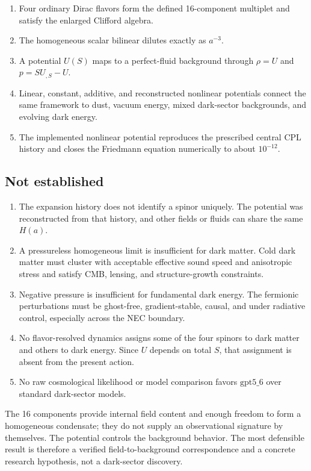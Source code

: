 \documentclass[11pt]{article}
\newcommand{\gptfield}{\ensuremath{\mathrm{gpt5\_6}}}
\begin{document}
\begin{enumerate}
\item Four ordinary Dirac flavors form the defined 16-component multiplet and
satisfy the enlarged Clifford algebra.
\item The homogeneous scalar bilinear dilutes exactly as $a^{-3}$.
\item A potential $U(S)$ maps to a perfect-fluid background through
$\rho=U$ and $p=SU_{,S}-U$.
\item Linear, constant, additive, and reconstructed nonlinear potentials
connect the same framework to dust, vacuum energy, mixed dark-sector
backgrounds, and evolving dark energy.
\item The implemented nonlinear potential reproduces the prescribed central
CPL history and closes the Friedmann equation numerically to about $10^{-12}$.
\end{enumerate}

\subsection{Not established}

\begin{enumerate}
\item The expansion history does not identify a spinor uniquely.  The
potential was reconstructed from that history, and other fields or fluids can
share the same $H(a)$.
\item A pressureless homogeneous limit is insufficient for dark matter.  Cold
dark matter must cluster with acceptable effective sound speed and anisotropic
stress and satisfy CMB, lensing, and structure-growth constraints.
\item Negative pressure is insufficient for fundamental dark energy.  The
fermionic perturbations must be ghost-free, gradient-stable, causal, and under
radiative control, especially across the NEC boundary.
\item No flavor-resolved dynamics assigns some of the four spinors to dark
matter and others to dark energy.  Since $U$ depends on total $S$, that
assignment is absent from the present action.
\item No raw cosmological likelihood or model comparison favors \gptfield{}
over standard dark-sector models.
\end{enumerate}

The 16 components provide internal field content and enough freedom to form a
homogeneous condensate; they do not supply an observational signature by
themselves.  The potential controls the background behavior.  The most
defensible result is therefore a verified field-to-background correspondence
and a concrete research hypothesis, not a dark-sector discovery.
\end{document}
